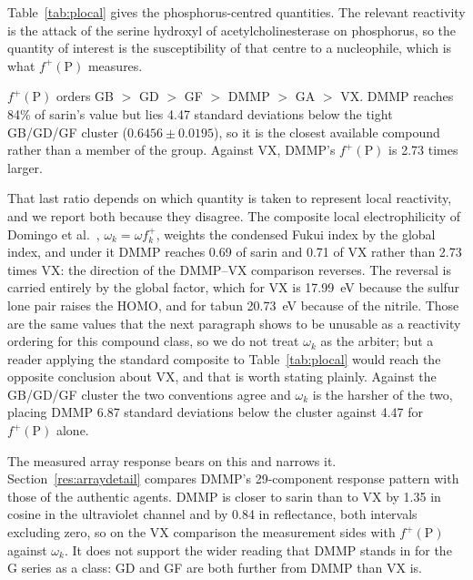 \documentclass[11pt,a4paper]{article}
\begin{document}
Table~\ref{tab:plocal} gives the phosphorus-centred quantities. The relevant
reactivity is the attack of the serine hydroxyl of acetylcholinesterase on
phosphorus, so the quantity of interest is the susceptibility of that centre to
a nucleophile, which is what $f^{+}(\mathrm{P})$ measures.

$f^{+}(\mathrm{P})$ orders GB $>$ GD $>$ GF $>$ DMMP $>$ GA $>$ VX. DMMP reaches
84\% of sarin's value but lies 4.47 standard deviations below the tight GB/GD/GF
cluster ($0.6456 \pm 0.0195$), so it is the closest available compound rather
than a member of the group. Against VX, DMMP's $f^{+}(\mathrm{P})$ is 2.73 times
larger.

That last ratio depends on which quantity is taken to represent local
reactivity, and we report both because they disagree. The composite local
electrophilicity of Domingo et al.~\cite{domingo2016},
$\omega_k = \omega f^{+}_k$, weights the condensed Fukui index by the global
index, and under it DMMP reaches 0.69 of sarin and 0.71 of VX rather than 2.73
times VX: the direction of the DMMP--VX comparison reverses. The reversal is
carried entirely by the global factor, which for VX is 17.99~eV because the
sulfur lone pair raises the HOMO, and for tabun 20.73~eV because of the nitrile.
Those are the same values that the next paragraph shows to be unusable as a
reactivity ordering for this compound class, so we do not treat $\omega_k$ as
the arbiter; but a reader applying the standard composite to Table~\ref{tab:plocal}
would reach the opposite conclusion about VX, and that is worth stating plainly.
Against the GB/GD/GF cluster the two conventions agree and $\omega_k$ is the
harsher of the two, placing DMMP 6.87 standard deviations below the cluster
against 4.47 for $f^{+}(\mathrm{P})$ alone.

The measured array response bears on this and narrows it.
Section~\ref{res:arraydetail} compares DMMP's 29-component response pattern with those of
the authentic agents. DMMP is closer to sarin than to VX by 1.35 in cosine in
the ultraviolet channel and by 0.84 in reflectance, both intervals excluding
zero, so on the VX comparison the measurement sides with $f^{+}(\mathrm{P})$
against $\omega_k$. It does not support the wider reading that DMMP stands in
for the G series as a class: GD and GF are both further from DMMP than VX is.

\begin{table}[!htb]
\centering
\caption{GFN2-xTB local reactivity at phosphorus for the six phosphorus-bearing
compounds. $f^{+}(\mathrm{P})$ is the condensed Fukui index for nucleophilic
attack at phosphorus. $\omega$ is the global electrophilicity index in the
definition of Parr et al.~\cite{parr1999} with $\eta$ equal to half the
HOMO--LUMO gap, and $\omega_k = \omega f^{+}(\mathrm{P})$ is the composite local
electrophilicity of Domingo et al.~\cite{domingo2016}. The two reactivity
conventions disagree about VX and the text says why.}
\label{tab:plocal}
\small

\end{table}
\end{document}
